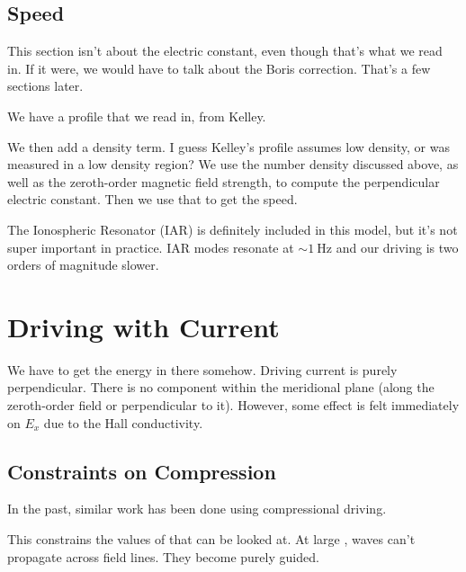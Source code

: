 \subsection{\Alfven Speed}

This section isn't about the electric constant, even though that's what we read in. If it were, we would have to talk about the Boris correction. That's a few sections later. 

We have a profile that we read in, from Kelley. 

We then add a density term. I guess Kelley's profile assumes low density, or was measured in a low density region? We use the number density discussed above, as well as the zeroth-order magnetic field strength, to compute the perpendicular electric constant. Then we use that to get the \Alfven speed. 

The Ionospheric \Alfven Resonator (IAR) is definitely included in this model, but it's not super important in practice. IAR modes resonate at $\sim\SI{1}{\Hz}$ and our driving is two orders of magnitude slower. 

\section{Driving with Current}
  \label{model_driving_section}

We have to get the energy in there somehow. Driving current is purely perpendicular. There is no component within the meridional plane (along the zeroth-order field or perpendicular to it). However, some effect is felt immediately on $E_x$ due to the Hall conductivity. 

\subsection{Constraints on Compression}

In the past, similar work has been done using compressional driving. 

This constrains the values of \azm that can be looked at. At large \azm, \Alfven waves can't propagate across field lines. They become purely guided. 


